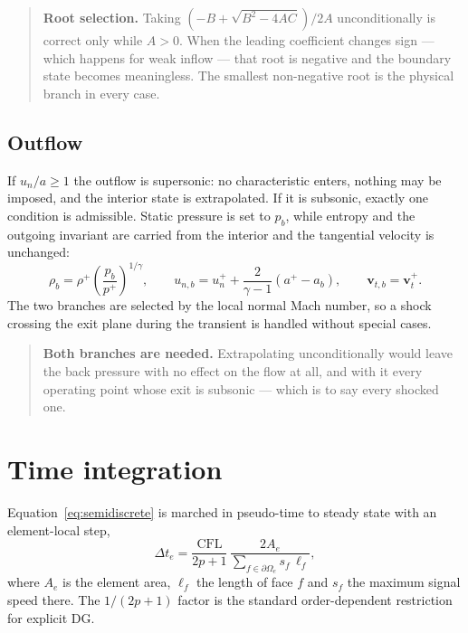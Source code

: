 \documentclass[11pt,a4paper]{article}
\newcommand{\vect}[1]{\boldsymbol{#1}}
\begin{document}
\begin{quote}
\textbf{Root selection.}  Taking $(-B + \sqrt{B^{2}-4AC})/2A$ unconditionally
is correct only while $A > 0$.  When the leading coefficient changes sign ---
which happens for weak inflow --- that root is negative and the boundary state
becomes meaningless.  The smallest non-negative root is the physical branch in
every case.
\end{quote}

\subsection{Outflow}

If $u_n/a \ge 1$ the outflow is supersonic: no characteristic enters, nothing may
be imposed, and the interior state is extrapolated.  If it is subsonic, exactly
one condition is admissible.  Static pressure is set to $p_b$, while entropy and
the outgoing invariant are carried from the interior and the tangential velocity
is unchanged:
\begin{equation}
  \rho_b = \rho^{+}\left(\frac{p_b}{p^{+}}\right)^{1/\gamma},
  \qquad
  u_{n,b} = u_n^{+} + \frac{2}{\gamma-1}\left(a^{+} - a_b\right),
  \qquad
  \vect{v}_{t,b} = \vect{v}_t^{+} .
  \label{eq:outflow}
\end{equation}
The two branches are selected by the local normal Mach number, so a shock
crossing the exit plane during the transient is handled without special cases.

\begin{quote}
\textbf{Both branches are needed.}  Extrapolating unconditionally would leave
the back pressure with no effect on the flow at all, and with it every operating
point whose exit is subsonic --- which is to say every shocked one.
\end{quote}

\section{Time integration}

Equation~\eqref{eq:semidiscrete} is marched in pseudo-time to steady state with
an element-local step,
\begin{equation}
  \Delta t_e
  = \frac{\mathrm{CFL}}{2p+1}\,
    \frac{2 A_e}{\displaystyle\sum_{f \in \partial\Omega_e} s_f\, \ell_f},
  \label{eq:dt}
\end{equation}
where $A_e$ is the element area, $\ell_f$ the length of face $f$ and $s_f$ the
maximum signal speed there.  The $1/(2p+1)$ factor is the standard
order-dependent restriction for explicit DG.
\end{document}
